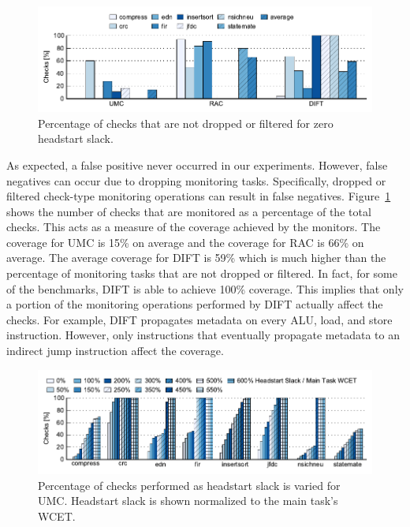 \begin{figure}
  \begin{center}
    \includegraphics{monitoring_hard_drop/data/zero_slack_coverage.pdf}
    \caption{Percentage of checks that are not dropped or filtered for zero
    headstart slack.}
    \label{fig:monitoring_hard_drop.evaluation.zero_slack_coverage}
  \end{center}
\end{figure}

As expected, a false positive never occurred in our experiments. However, false
negatives can occur due to dropping monitoring tasks. Specifically, dropped or
filtered check-type monitoring operations can result in false negatives.
Figure~\ref{fig:monitoring_hard_drop.evaluation.zero_slack_coverage} shows the
number of checks that are monitored as a percentage of the total checks. This
acts as a measure of the coverage achieved by the monitors. The coverage for
UMC is 15\% on average and the coverage for RAC is 66\% on average. The average
coverage for DIFT is 59\% which is much higher than the percentage of
monitoring tasks that are not dropped or filtered. In fact, for some of the
benchmarks, DIFT is able to achieve 100\% coverage. This implies that only a
portion of the monitoring operations performed by DIFT actually affect the
checks.  For example, DIFT propagates metadata on every ALU, load, and store
instruction. However, only instructions that eventually propagate metadata to
an indirect jump instruction affect the coverage.

\begin{figure}
  \begin{center}
    \includegraphics{monitoring_hard_drop/data/umc_sweep.pdf}
    \caption{Percentage of checks performed as headstart slack is varied for
    UMC. Headstart slack is shown normalized to the main task's WCET.}
    \label{fig:monitoring_hard_drop.evaluation.umc_sweep}
  \end{center}
\end{figure}

